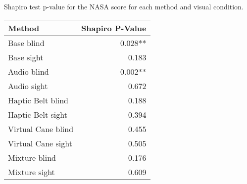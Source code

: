 
\centering
\caption{Shapiro test p-value for the NASA score for each method and visual condition.}
\label{tab:shapiro_nasa_score}
\begin{tabular}{lr}
\toprule
            Method & Shapiro P-Value \\
\midrule
        Base blind &         0.028** \\
        Base sight &           0.183 \\
       Audio blind &         0.002** \\
       Audio sight &           0.672 \\
 Haptic Belt blind &           0.188 \\
 Haptic Belt sight &           0.394 \\
Virtual Cane blind &           0.455 \\
Virtual Cane sight &           0.505 \\
     Mixture blind &           0.176 \\
     Mixture sight &           0.609 \\
\bottomrule
\end{tabular}
